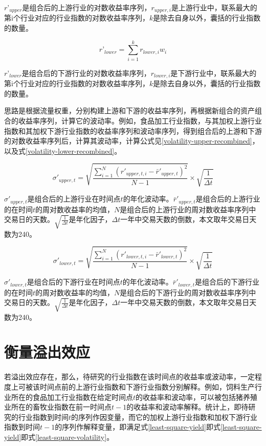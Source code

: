 \documentclass{sysuthesis}
\begin{document}
${r’_{upper}}$是组合后的上游行业的对数收益率序列，${r_{upper,i}}$是上游行业中，联系最大的第i个行业对应的行业指数的对数收益率序列，$k$是除去自身以外，囊括的行业指数的数量。

\begin{equation}
\label{yield-lower-recombined} 
{r’_{lower}} = \sum\limits_{i = 1}^k {{r_{lower,i}}{w_i}} 
\end{equation}

${r’_{lower}}$是组合后的下游行业的对数收益率序列，${r_{lower,i}}$是下游行业中，联系最大的第i个行业对应的行业指数的对数收益率序列，$k$是除去自身以外，囊括的行业指数的数量。

思路是根据流量权重，分别构建上游和下游的收益率序列，再根据新组合的资产组合的收益率序列，计算它的波动率。例如，食品加工行业指数，与其加权上游行业指数和其加权下游行业指数的收益率序列和波动率序列，得到组合后的上游和下游的对数收益率序列后，计算其波动率，计算公式见\ref{volatility-upper-recombined}，以及式\ref{volatility-lower-recombined}。

\begin{equation}
\label{volatility-upper-recombined} 
{\sigma '_{upper,t}} = \sqrt {\frac{{\sum\limits_{i = 1}^N {{{({{r'}_{upper,t,i}} - {{\bar r'}_{upper,t}})}^2}} }}{{N - 1}}}  \times \sqrt {\frac{1}{{\Delta t}}} 
\end{equation}

${\sigma '_{upper,t}} $是组合后的上游行业在时间点$t$的年化波动率。${{\bar r'}_{upper,t}}$是组合后的上游行业的在时间$t$的周对数收益率的均值，$N$是组合后的上游行业的周对数收益率序列中交易日的天数。$\sqrt {\frac{1}{{\Delta t}}}$是年化因子，${\Delta t}$一年中交易天数的倒数，本文取年交易日天数为240。

\begin{equation}
\label{volatility-lower-recombined} 
{\sigma '_{lower,t}} = \sqrt {\frac{{\sum\limits_{i = 1}^N {{{({{r'}_{lower,t,i}} - {{\bar r'}_{lower,t}})}^2}} }}{{N - 1}}}  \times \sqrt {\frac{1}{{\Delta t}}} 
\end{equation}

${\sigma '_{lower,t}} $是组合后的下游行业在时间点$t$的年化波动率。${{\bar r'}_{lower,t}}$是组合后的下游行业的在时间$t$的周对数收益率的均值，$N$是组合后的下游行业的周对数收益率序列中交易日的天数。$\sqrt {\frac{1}{{\Delta t}}}$是年化因子，${\Delta t}$一年中交易天数的倒数，本文取年交易日天数为240。

\section{衡量溢出效应}
若溢出效应存在，那么，待研究的行业指数在该时间点的收益率或波动率，一定程度上可被该时间点前的上游行业指数和下游行业指数分别解释。例如，饲料生产行业所在的食品加工行业指数在给定时间点$t$的收益率和波动率，可以被包括猪养殖业所在的畜牧业指数在前一时间点$t-1$的收益率和波动率解释。统计上，即待研究的行业指数到时间$t$的序列作因变量，而它的加权上游行业指数和加权下游行业指数到时间$t-1$的序列作解释变量，即满足式\ref{least-square-yield}即式\ref{least-square-yield}即式\ref{least-square-volatility}。
\end{document}
